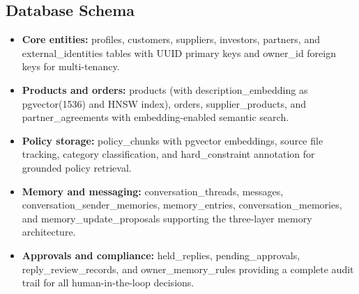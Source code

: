 \documentclass[11pt]{article}
\begin{document}
\subsection{Database Schema}
\label{app:schema}
\begin{itemize}
\item \textbf{Core entities:} profiles, customers, suppliers, investors, partners, and external\_identities tables with UUID primary keys and owner\_id foreign keys for multi-tenancy.

\item \textbf{Products and orders:} products (with description\_embedding as pgvector(1536) and HNSW index), orders, supplier\_products, and partner\_agreements with embedding-enabled semantic search.
\item \textbf{Policy storage:} policy\_chunks with pgvector embeddings, source file tracking, category classification, and hard\_constraint annotation for grounded policy retrieval.
\item \textbf{Memory and messaging:} conversation\_threads, messages, conversation\_sender\_memories, memory\_entries, conversation\_memories, and memory\_update\_proposals supporting the three-layer memory architecture.
\item \textbf{Approvals and compliance:} held\_replies, pending\_approvals, reply\_review\_records, and owner\_memory\_rules providing a complete audit trail for all human-in-the-loop decisions.

\end{itemize}
\end{document}
